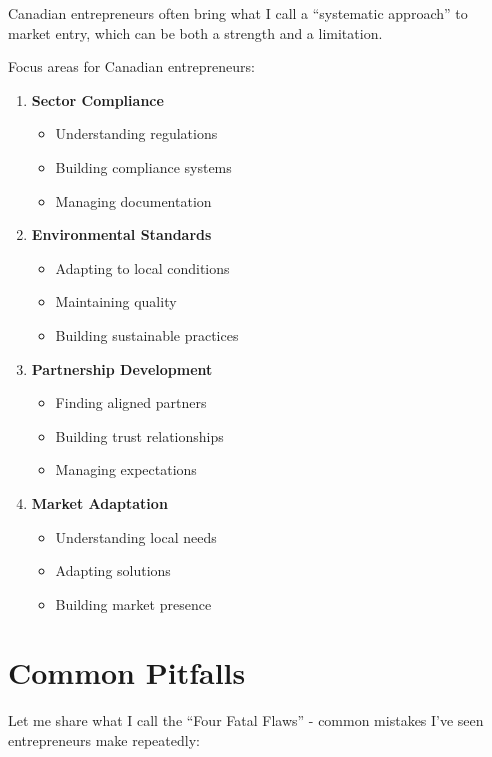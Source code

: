 Canadian entrepreneurs often bring what I call a ``systematic approach'' to market entry, which can be both a strength and a limitation.

Focus areas for Canadian entrepreneurs:

\begin{enumerate}
    \item \textbf{Sector Compliance}
    \begin{itemize}
        \item Understanding regulations
        \item Building compliance systems
        \item Managing documentation
    \end{itemize}

    \item \textbf{Environmental Standards}
    \begin{itemize}
        \item Adapting to local conditions
        \item Maintaining quality
        \item Building sustainable practices
    \end{itemize}

    \item \textbf{Partnership Development}
    \begin{itemize}
        \item Finding aligned partners
        \item Building trust relationships
        \item Managing expectations
    \end{itemize}

    \item \textbf{Market Adaptation}
    \begin{itemize}
        \item Understanding local needs
        \item Adapting solutions
        \item Building market presence
    \end{itemize}
\end{enumerate}


\section{Common Pitfalls}\label{sec:common-pitfalls}

Let me share what I call the ``Four Fatal Flaws'' - common mistakes I've seen entrepreneurs make repeatedly:

